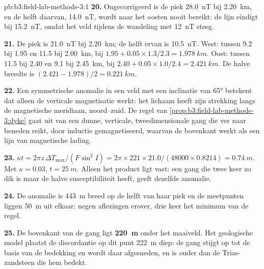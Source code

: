 \begin{solution}{pb:b3:field-lab-methods-3:1}
\textbf{20.} Ongecorrigeerd is de piek \qty{28.0}{nT} bij \qty{2.20}{km}, en
de helft daarvan, \qty{14.0}{nT}, wordt naar het oosten nooit bereikt: de lijn
eindigt bij \qty{15.2}{nT}, omdat het veld tijdens de
wandeling met \qty{12}{nT} steeg.

\textbf{21.} De piek is \qty{21.0}{nT} bij \qty{2.20}{km}; de helft ervan is
\qty{10.5}{nT}. West: tussen \num{9.2} bij \num{1.95} en \num{11.5} bij
\qty{2.00}{km}, bij $1.95 + 0.05\times1.3/2.3 = \qty{1.978}{km}$. Oost:
tussen \num{11.5} bij \num{2.40} en \num{9.1} bij \qty{2.45}{km}, bij
$2.40 + 0.05\times1.0/2.4 = \qty{2.421}{km}$. De halve breedte is $(2.421
- 1.978)/2 = \qty{0.221}{km}$.

\textbf{22.} Een symmetrische anomalie in een veld met een inclinatie van \ang{65} betekent dat
alleen de verticale magnetisatie werkt: het lichaam heeft zijn strekking langs de magnetische
meridiaan, noord--zuid. De regel van
\cref{prop:b3:field-lab-methods-3:dyke} gaat uit van een dunne, verticale,
tweedimensionale gang die ver naar beneden reikt, door inductie gemagnetiseerd,
waarvan de bovenkant werkt als een lijn van magnetische lading.

\textbf{23.} $\kappa t = 2\pi z\,\Delta T_\mathrm{max}/(F\sin^2 I) = 2\pi\times
221\times21.0/(48000\times0.8214) = \qty{0.74}{m}$. Met $\kappa =
0.03$, $t = \qty{25}{m}$. Alleen het product ligt vast: een gang die twee keer zo
dik is maar de halve susceptibiliteit heeft, geeft dezelfde anomalie.

\textbf{24.} De anomalie is \qty{443}{m} breed op de helft van haar piek en de meetpunten
liggen \qty{50}{m} uit elkaar: negen aflezingen erover, drie keer het
minimum van de regel.

\textbf{25.} De bovenkant van de gang ligt
\textbf{\qty[text-series-to-math=true]{220}{m}} onder het maaiveld. Het
geologische model plaatst de discordantie op dit punt \qty{222}{m} diep:
de gang stijgt op tot de basis van de bedekking en wordt daar afgesneden, en is
ouder dan de Trias-zandsteen die hem bedekt.
\end{solution}
